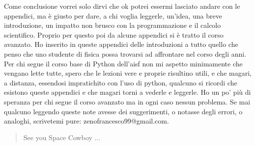 \documentclass[10pt,a4paper]{article}
\begin{document}
Come conclusione vorrei solo dirvi che ok potrei essermi lasciato andare con le appendici, ma è giusto per dare, a chi voglia leggerle, un'idea, una breve introduzione, un impatto non brusco con la programmazione e il calcolo scientifico. Proprio per questo poi da alcune appendici si è tratto il corso avanzato.
Ho inserito in queste appendici delle introduzioni a tutto quello che penso che uno studente di fisica possa trovarsi ad affrontare nel corso degli anni.
Per chi segue il corso base di Python dell'aisf non mi aspetto minimamente che vengano lette tutte, spero che le lezioni vere e proprie risultino utili, e che magari, a distanza, essendosi impratichito con l'uso di python, qualcuno si ricordi che esistono queste appendici e che magari torni a vederle e leggerle. Ho un po' più di speranza per chi segue il corso avanzato ma in ogni caso nessun problema. Se mai qualcuno leggendo queste note avesse dei suggerimenti, o notasse degli errori, o analoghi, scrivetemi pure: zenofrancesco99@gmail.com.







\vfill
\begin{quote}
    See you Space Cowboy ...
\end{quote}
\end{document}
